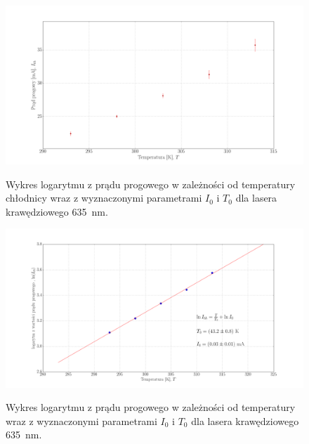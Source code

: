 \documentclass[a4paper, portrait,12pt]{report}
\begin{document}
\begin{figure}
\center
  \includegraphics[scale=0.30]{plot635/plot_lin_i_th.png}
  \label{rys1}
  \caption{Wykres logarytmu z prądu progowego w zależności od temperatury chłodnicy wraz z wyznaczonymi parametrami $I_0$ i $T_0$ dla lasera krawędziowego 635 \,nm.} 
\end{figure}

\begin{figure}
\center
  \includegraphics[scale=0.30]{plot635/fit_i_0.png}
  \label{rys1}
  \caption{Wykres logarytmu z prądu progowego w zależności od temperatury wraz z wyznaczonymi parametrami $I_0$ i $T_0$ dla lasera krawędziowego 635 \,nm.} 
\end{figure}
\end{document}
